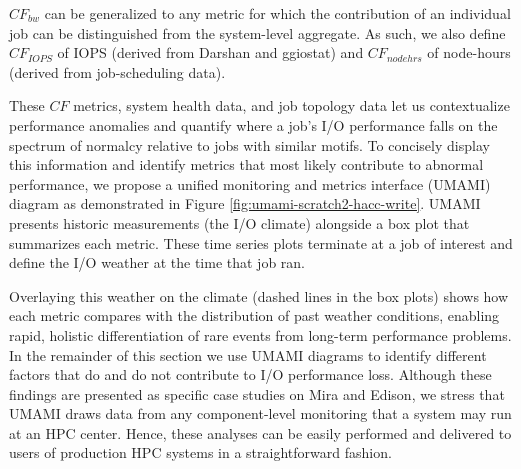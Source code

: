 $\mathit{CF}_{\mathit{bw}}$ can be generalized to any metric for which the contribution of an individual job can be distinguished from the system-level aggregate.
As such, we also define $\mathit{CF}_{\mathit{IOPS}}$ of IOPS (derived from Darshan and ggiostat) and $\mathit{CF}_{\mathit{nodehrs}}$ of node-hours (derived from job-scheduling data).


These $\mathit{CF}$ metrics, system health data, and job topology data let us contextualize performance anomalies and quantify where a job's I/O performance falls on the spectrum of normalcy relative to jobs with similar motifs.
To concisely display this information and identify metrics that most likely contribute to abnormal performance, we propose a unified monitoring and metrics interface (UMAMI) diagram as demonstrated in Figure \ref{fig:umami-scratch2-hacc-write}.
UMAMI presents historic measurements (the I/O climate) alongside a box plot that summarizes each metric.
These time series plots terminate at a job of interest and define the I/O weather at the time that job ran.

Overlaying this weather on the climate (dashed lines in the box plots) shows how each metric compares with the distribution of past weather conditions, enabling rapid, holistic differentiation of rare events from long-term performance problems.
In the remainder of this section
we use UMAMI diagrams to identify different factors that do and do not contribute to I/O performance loss.
Although these findings are presented as specific case studies on Mira and Edison, we stress that UMAMI draws data from any component-level monitoring that a system may run at an HPC center.
Hence, these analyses can be easily performed and delivered to users of production HPC systems in a straightforward fashion.

